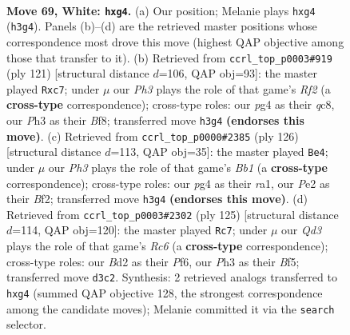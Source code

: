 \documentclass[11pt]{article}
\begin{document}
\clearpage

\begin{figure}[p]\centering
\begin{subfigure}{0.46\textwidth}\centering
\resizebox{\linewidth}{!}{%
\newchessgame
\chessboard[
  setfen={5r2/3qb1k1/5n2/P1p2p1p/3p1Pp1/3Q3P/1R1BPK2/3N4 w - - 1 69},
  showmover=false,
  pgfstyle=straightmove, color=movearrow, markmove={h3-g4}
]}
\caption{}
\end{subfigure}\hfill
\begin{subfigure}{0.46\textwidth}\centering
\resizebox{\linewidth}{!}{%
\newchessgame
\chessboard[
  setfen={2Q2b2/2N2r1k/3p2pn/2pPp3/2P2qPp/7P/5PB1/5RK1 b - - 8 61},
  showmover=false,
  pgfstyle=straightmove, color=movearrow, markmove={f7-c7}
]}
\caption{}
\end{subfigure}
\\[4pt]
\begin{subfigure}{0.46\textwidth}\centering
\resizebox{\linewidth}{!}{%
\newchessgame
\chessboard[
  setfen={q4k2/4n2p/1bp3pP/1p2PpP1/1P1P4/1R3Q2/5BK1/rB6 w - - 8 64},
  showmover=false,
  pgfstyle=straightmove, color=movearrow, markmove={b1-e4}
]}
\caption{}
\end{subfigure}\hfill
\begin{subfigure}{0.46\textwidth}\centering
\resizebox{\linewidth}{!}{%
\newchessgame
\chessboard[
  setfen={8/1p3k2/5p1p/3q1bpP/1p1P4/1Pr2P2/P3Q1P1/3RN2K b - - 4 63},
  showmover=false,
  pgfstyle=straightmove, color=movearrow, markmove={c3-c7}
]}
\caption{}
\end{subfigure}
\caption{\textbf{Move 69, White: \texttt{hxg4}.} (a) Our position; Melanie plays \texttt{hxg4} (\texttt{h3g4}). Panels (b)--(d) are the retrieved master positions whose correspondence most drove this move (highest QAP objective among those that transfer to it). (b) Retrieved from \texttt{ccrl\_top\_p0003\#919} (ply 121) [structural distance $d$=106, QAP obj=93]: the master played \texttt{Rxc7}; under $\mu$ our \emph{Ph3} plays the role of that game's \emph{Rf2} (a \textbf{cross-type} correspondence); cross-type roles: our \emph{p}g4 as their \emph{q}c8, our \emph{P}h3 as their \emph{B}f8; transferred move \texttt{h3g4} \textbf{(endorses this move)}. (c) Retrieved from \texttt{ccrl\_top\_p0000\#2385} (ply 126) [structural distance $d$=113, QAP obj=35]: the master played \texttt{Be4}; under $\mu$ our \emph{Ph3} plays the role of that game's \emph{Bb1} (a \textbf{cross-type} correspondence); cross-type roles: our \emph{p}g4 as their \emph{r}a1, our \emph{P}e2 as their \emph{B}f2; transferred move \texttt{h3g4} \textbf{(endorses this move)}. (d) Retrieved from \texttt{ccrl\_top\_p0003\#2302} (ply 125) [structural distance $d$=114, QAP obj=120]: the master played \texttt{Rc7}; under $\mu$ our \emph{Qd3} plays the role of that game's \emph{Rc6} (a \textbf{cross-type} correspondence); cross-type roles: our \emph{B}d2 as their \emph{P}f6, our \emph{P}h3 as their \emph{B}f5; transferred move \texttt{d3c2}. Synthesis: 2 retrieved analogs transferred to \texttt{hxg4} (summed QAP objective 128, the strongest correspondence among the candidate moves); Melanie committed it via the \texttt{search} selector.}
\label{fig:thought-m136}
\end{figure}
\end{document}
